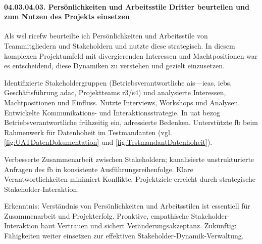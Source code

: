 \paragraph*{04.03.04.03. Persönlichkeiten und Arbeitsstile Dritter beurteilen und zum Nutzen des Projekts einsetzen}
\label{para:04.03.04.03_PersönlichkeitenUndArbeitsstileDritter}

\par Als \gls{wsl} \gls{ricefw} beurteilte ich Persönlichkeiten und Arbeitsstile von Teammitgliedern und Stakeholdern und nutzte diese strategisch. In diesem komplexen Projektumfeld mit divergierenden Interessen und Machtpositionen war es entscheidend, diese Dynamiken zu verstehen und gezielt einzusetzen.

\par Identifizierte Stakeholdergruppen (Betriebsverantwortliche \gls{ais}—\glspl{iea}, \glspl{ieb}, Geschäftsführung \gls{adac}, Projektteams \gls{r3}/\gls{s4}) und analysierte Interessen, Machtpositionen und Einfluss. Nutzte Interviews, Workshops und Analysen. Entwickelte Kommunikations- und Interaktionsstrategie. In \gls{uat} bezog Betriebsverantwortliche frühzeitig ein, adressierte Bedenken. Unterstützte \gls{fb} beim Rahmenwerk für Datenhoheit im Testmandanten (vgl.\autoref{fig:UATDatenDokumentation} und \autoref{fig:TestmandantDatenhoheit}).

\par Verbesserte Zusammenarbeit zwischen Stakeholdern; kanalisierte unstrukturierte Anfragen des \gls{fb} in konsistente Ausführungsreihenfolge. Klare Verantwortlichkeiten minimiert Konflikte. Projektziele erreicht durch strategische Stakeholder-Interaktion.

\par Erkenntnis: Verständnis von Persönlichkeiten und Arbeitsstilen ist essentiell für Zusammenarbeit und Projekterfolg. Proaktive, empathische Stakeholder-Interaktion baut Vertrauen und sichert Veränderungsakzeptanz. Zukünftig: Fähigkeiten weiter einsetzen zur effektiven Stakeholder-Dynamik-Verwaltung.